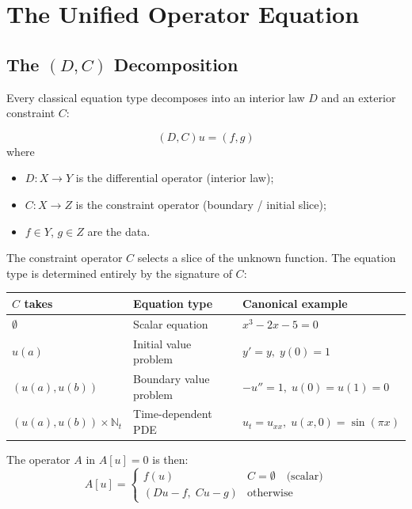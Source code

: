 \documentclass{lmcs}
\theoremstyle{plain}
\theoremstyle{definition}
\newcommand{\NN}{\mathbb{N}}
\begin{document}
\section{The Unified Operator Equation}\label{sec:unified}

\subsection{The \texorpdfstring{$(D, C)$}{(D, C)} Decomposition}

Every classical equation type decomposes into an interior law $D$ and an
exterior constraint $C$:

\begin{defi}
\[
(D, C) u = (f, g)
\]
where
\begin{itemize}
\item $D : X \to Y$ is the differential operator (interior law);
\item $C : X \to Z$ is the constraint operator (boundary / initial slice);
\item $f \in Y$, $g \in Z$ are the data.
\end{itemize}
\end{defi}

The constraint operator $C$ selects a slice of the unknown function. The
equation type is determined entirely by the signature of $C$:

\begin{center}
\begin{tabular}{l l l}
\toprule
$C$ takes & Equation type & Canonical example \\
\midrule
$\emptyset$ & Scalar equation & $x^3 - 2x - 5 = 0$ \\
$u(a)$ & Initial value problem & $y' = y,\; y(0) = 1$ \\
$(u(a), u(b))$ & Boundary value problem & $-u'' = 1,\; u(0) = u(1) = 0$ \\
$(u(a), u(b)) \times \NN_t$ & Time-dependent PDE & $u_t = u_{xx},\;
  u(x,0) = \sin(\pi x)$ \\
\bottomrule
\end{tabular}
\end{center}

The operator $A$ in $A[u] = 0$ is then:
\[
A[u] = \begin{cases}
f(u) & C = \emptyset \quad\text{(scalar)} \\
(Du - f,\; Cu - g) & \text{otherwise}
\end{cases}
\]
\end{document}
